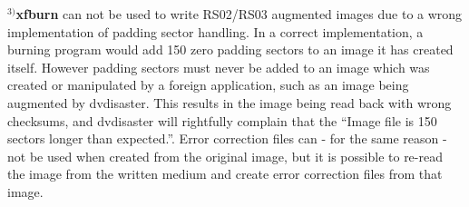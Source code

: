 \bigskip

$^{3)}${\bf xfburn} can not be used to write RS02/RS03 augmented images due to a
wrong implementation of padding sector handling. In a correct implementation,
a burning program would add 150 zero padding sectors to an image it has created
itself. However padding sectors must never be added to an image which was created
or manipulated by a foreign application, such as an image being augmented by dvdisaster.
This results in the image being read back with wrong checksums, and dvdisaster will
rightfully complain that the ``Image file is 150 sectors longer than expected.''.
Error correction files can - for the same reason - not be used when created from
the original image, but it is possible to re-read the image from the written
medium and create error correction files from that image. 
